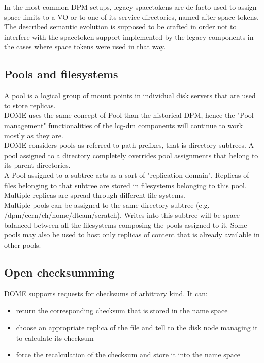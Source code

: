 \documentclass[a4paper,10pt]{scrreprt}
\begin{document}
In the most common DPM setups, legacy spacetokens are de facto used to assign space limits to a VO or to one of its service directories,
named after space tokens.\\
The described semantic evolution is supposed to be crafted in order not to interfere with the spacetoken support implemented by the legacy components in the cases
where space tokens were used in that way.


\subsection{Pools and filesystems}
A pool is a logical group of mount points in individual disk servers that are used to store replicas.\\

DOME uses the same concept of Pool than the historical DPM, hence the "Pool management" functionalities
of the lcg-dm components will continue to work mostly as they are.\\

DOME considers pools as referred to path prefixes, that is directory subtrees. A pool assigned to a directory
completely overrides pool assignments that belong to its parent directories.\\

A Pool assigned to a subtree acts as a sort of "replication domain". Replicas of files belonging to that subtree
are stored in filesystems belonging to this pool. Multiple replicas are spread through different file systems.\\

Multiple pools can be assigned to the same directory subtree (e.g. /dpm/cern/ch/home/dteam/scratch). 
Writes into this subtree will be space-balanced between all the filesystems composing the pools assigned to it. Some pools may also be
used to host only replicas of content that is already available in other pools.\\

\subsection{Open checksumming}
DOME supports requests for checksums of arbitrary kind. It can:\\

\begin{itemize}
 \item return the corresponding checksum that is stored in the name space
 \item choose an appropriate replica of the file and tell to the disk node managing it to calculate its checksum
 \item force the recalculation of the checksum and store it into the name space
\end{itemize}
\end{document}

